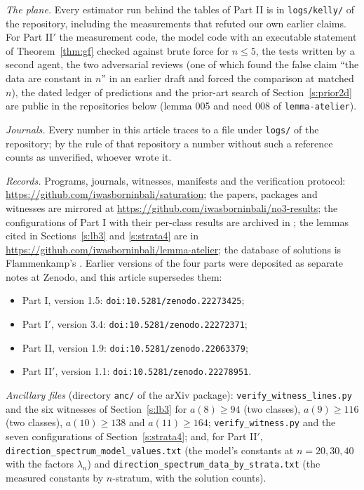 \documentclass[11pt,a4paper]{article}
\begin{document}
\emph{The plane.}  Every estimator run behind the tables of Part II is in \texttt{logs/kelly/} of the repository, including the
measurements that refuted our own earlier claims.  For Part II$'$ the measurement code, the model code with an executable
statement of Theorem~\ref{thm:gf} checked against brute force for $n\le5$, the tests written by a second agent, the two
adversarial reviews (one of which found the false claim ``the data are constant in $n$'' in an earlier draft and forced the
comparison at matched $n$), the dated ledger of predictions and the prior-art search of Section~\ref{s:prior2d} are public in
the repositories below (lemma 005 and need 008 of \texttt{lemma-atelier}).

\emph{Journals.}  Every number in this article traces to a file under \texttt{logs/} of the repository; by the rule of that
repository a number without such a reference counts as unverified, whoever wrote it.

\emph{Records.}  Programs, journals, witnesses, manifests and the verification protocol:
\url{https://github.com/iwasborninbali/saturation}; the papers, packages and witnesses are mirrored at
\url{https://github.com/iwasborninbali/no3-results}; the configurations of Part I with their per-class results are
archived in \cite{Witnesses}; the lemmas cited in Sections~\ref{s:lb3} and \ref{s:strata4} are in
\url{https://github.com/iwasborninbali/lemma-atelier}; the database of solutions is Flammenkamp's \cite{Flammenkamp}.
Earlier versions of the four parts were deposited as separate notes at Zenodo, and this article supersedes them:
\begin{itemize}\itemsep0pt
\item Part I, version 1.5: \texttt{doi:10.5281/zenodo.22273425};
\item Part I$'$, version 3.4: \texttt{doi:10.5281/zenodo.22272371};
\item Part II, version 1.9: \texttt{doi:10.5281/zenodo.22063379};
\item Part II$'$, version 1.1: \texttt{doi:10.5281/zenodo.22278951}.
\end{itemize}

\emph{Ancillary files} (directory \texttt{anc/} of the arXiv package): \texttt{verify\_witness\_lines.py} and the six witnesses
of Section~\ref{s:lb3} for $a(8)\ge94$ (two classes), $a(9)\ge116$ (two classes), $a(10)\ge138$ and $a(11)\ge164$;
\texttt{verify\_witness.py} and the seven configurations of Section~\ref{s:strata4}; and, for Part II$'$,
\texttt{direction\_spectrum\_model\_values.txt} (the model's constants at $n=20,30,40$ with the factors $\lambda_n$) and
\texttt{direction\_spectrum\_data\_by\_strata.txt} (the measured constants by $n$-stratum, with the solution counts).
\end{document}
